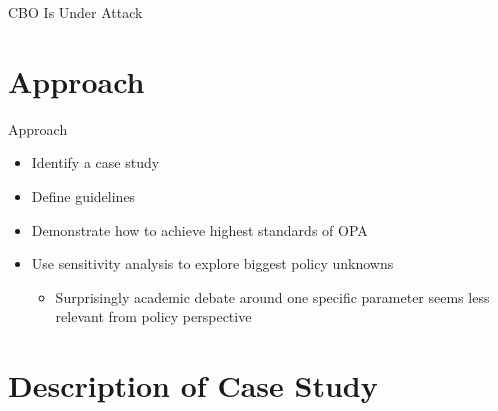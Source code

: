 \documentclass{beamer}
\begin{document}
\begin{frame}{CBO Is Under Attack}
\end{frame}

  
 
 \section{Approach}
\begin{frame}{Approach}
\begin{itemize}
\item Identify a case study
\item Define guidelines
\item Demonstrate how to achieve highest standards of OPA
\item Use sensitivity analysis to explore biggest policy unknowns 
\begin{itemize}
\item  Surprisingly academic debate around one specific parameter seems less relevant from policy perspective
\end{itemize}
\end{itemize}
\end{frame} 

\section[Case Study]{Description of Case Study}
\end{document}
